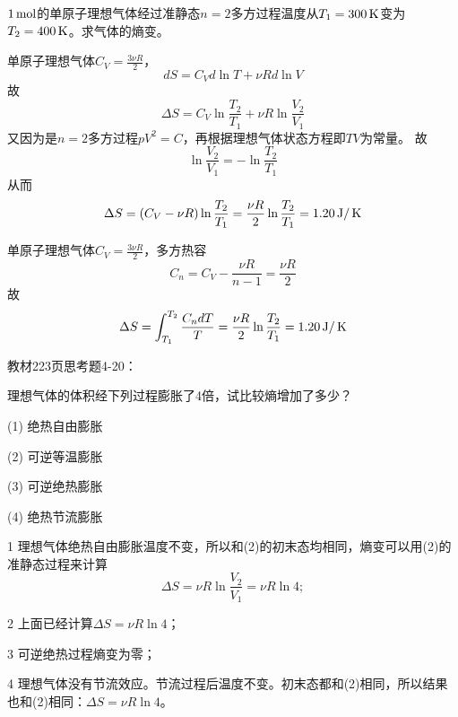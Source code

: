 \documentclass[CJK]{beamer}
\begin{document}
\begin{frame}
  \chtitle{\proid (\stwo)}
  \bch
  $1\,\mathrm{mol}$的单原子理想气体经过准静态$n=2$多方过程温度从$T_1=300\,\mathrm{K}$变为$T_2 = 400\,\mathrm{K}$。求气体的熵变。
  \ech
\end{frame}


\begin{frame}
  \bch
  单原子理想气体$C_V=\frac{3\nu R}{2}$，
  $$dS = C_V d\ln T + \nu R d\ln V$$
  故
  $$\Delta S = C_V\ln\frac{T_2}{T_1} + \nu R\ln\frac{V_2}{V_1}$$
  又因为是$n=2$多方过程$pV^2 = C$，再根据理想气体状态方程即$TV$为常量。
  故$$\ln\frac{V_2}{V_1} = - \ln\frac{T_2}{T_1}$$
  从而
  $$\Delta S = (C_V-\nu R)\ln\frac{T_2}{T_1} = \frac{\nu R}{2}\ln\frac{T_2}{T_1} = 1.20\,\mathrm{J}/\,\mathrm{K}$$
  \ech
\end{frame}


\begin{frame}
  \bch
  单原子理想气体$C_V=\frac{3\nu R}{2}$，多方热容
  $$C_n = C_V - \frac{\nu R}{n-1} = \frac{\nu R}{2}$$
  故
  $$\Delta S = \int_{T_1}^{T_2} \frac{C_n dT}{T} = \frac{\nu R}{2} \ln\frac{T_2}{T_1} = 1.20\,\mathrm{J}/\,\mathrm{K}$$
  \ech
\end{frame}


\begin{frame}
  \chtitle{\proid (\stwo)}
  \bch
  教材223页思考题4-20：

  理想气体的体积经下列过程膨胀了4倍，试比较熵增加了多少？
  \bitem
\item[(1)]{绝热自由膨胀}
\item[(2)]{可逆等温膨胀}
\item[(3)]{可逆绝热膨胀}
\item[(4)]{绝热节流膨胀}  
  \eitem
  \ech
\end{frame}


\begin{frame}
  \bch
  \bitem
\item[1]{理想气体绝热自由膨胀温度不变，所以和(2)的初末态均相同，熵变可以用(2)的准静态过程来计算
  $$\Delta S = \nu R \ln\frac{V_2}{V_1} = \nu R \ln 4;$$}
\item[2]{上面已经计算$\Delta S = \nu R \ln 4$；}
\item[3]{可逆绝热过程熵变为零；}
\item[4]{理想气体没有节流效应。节流过程后温度不变。初末态都和(2)相同，所以结果也和(2)相同：$\Delta S = \nu R \ln 4$。}
  \eitem
  \ech
\end{frame}
\end{document}
